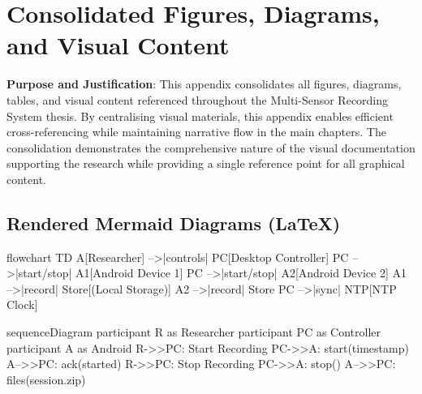 \chapter{Consolidated Figures, Diagrams, and Visual Content}

\textbf{Purpose and Justification}: This appendix consolidates all figures, diagrams, tables, and visual content referenced throughout the Multi-Sensor Recording System thesis. By centralising visual materials, this appendix enables efficient cross-referencing while maintaining narrative flow in the main chapters. The consolidation demonstrates the comprehensive nature of the visual documentation supporting the research while providing a single reference point for all graphical content.




\section*{Rendered Mermaid Diagrams (LaTeX)}

\begin{mermaid}
    flowchart TD
    A[Researcher] -->|controls| PC[Desktop Controller]
    PC -->|start/stop| A1[Android Device 1]
    PC -->|start/stop| A2[Android Device 2]
    A1 -->|record| Store[(Local Storage)]
    A2 -->|record| Store
    PC -->|sync| NTP[NTP Clock]
\end{mermaid}

\begin{mermaid}
    sequenceDiagram
    participant R as Researcher
    participant PC as Controller
    participant A as Android
    R->>PC: Start Recording
    PC->>A: start(timestamp)
    A-->>PC: ack(started)
    R->>PC: Stop Recording
    PC->>A: stop()
    A-->>PC: files(session.zip)
\end{mermaid}

